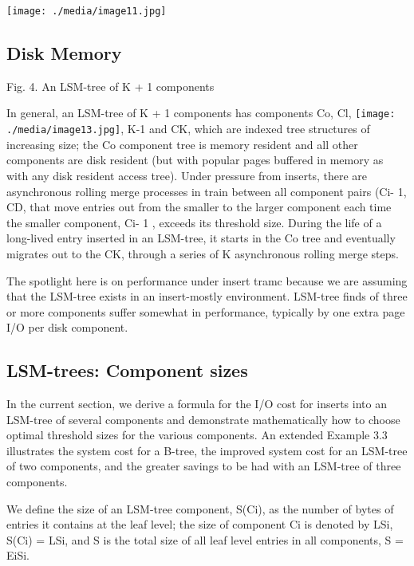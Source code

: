 \documentclass[a4paper,11pt,notitlepage,twoside,openright]{article}
\begin{document}
\texttt{[image: ./media/image11.jpg]}


\hypertarget{disk-memory}{%
\subsection{ Disk Memory}\label{disk-memory}}


Fig. 4. An LSM-tree of K + 1 components

In general, an LSM-tree of K + 1 components has components Co, Cl,
\texttt{[image: ./media/image13.jpg]},
K-1 and CK, which are indexed tree structures of increasing size; the Co
component tree is memory resident and all other components are disk
resident (but with popular pages buffered in memory as with any disk
resident access tree). Under pressure from inserts, there are
asynchronous rolling merge processes in train between all component
pairs (Ci- 1, CD, that move entries out from the smaller to the larger
component each time the smaller component, Ci- 1 , exceeds its threshold
size. During the life of a long-lived entry inserted in an LSM-tree, it
starts in the Co tree and eventually migrates out to the CK, through a
series of K asynchronous rolling merge steps.

The spotlight here is on performance under insert tramc because we are
assuming that the LSM-tree exists in an insert-mostly environment.
LSM-tree finds of three or more components suffer somewhat in
performance, typically by one extra page I/O per disk component.


\hypertarget{lsm-trees-component-sizes}{%
\subsection{LSM-trees: Component
sizes}\label{lsm-trees-component-sizes}}


In the current section, we derive a formula for the I/O cost for inserts
into an LSM-tree of several components and demonstrate mathematically
how to choose optimal threshold sizes for the various components. An
extended Example 3.3 illustrates the system cost for a B-tree, the
improved system cost for an LSM-tree of two components, and the greater
savings to be had with an LSM-tree of three components.

We define the size of an LSM-tree component, S(Ci), as the number of
bytes of entries it contains at the leaf level; the size of component Ci
is denoted by LSi, S(Ci) = LSi, and S is the total size of all leaf
level entries in all components, S = EiSi.
\end{document}

